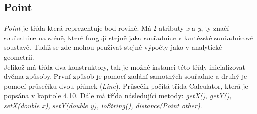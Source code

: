 \subsection{Point} 
\textit{Point} je třída která reprezentuje bod rovině. Má 2 atributy \textit{x} a \textit{y}, ty značí souřadnice na scéně, které fungují stejně jako souřadnice v kartézské souřadnicové soustavě. Tudíž se zde mohou používat stejné výpočty jako v analytické geometrii. \\
Jelikož má třída dva konstruktory, tak je možné instanci této třídy inicializovat dvěma způsoby. První způsob je pomocí zadání samotných souřadnic a druhý je pomocí průsečíku dvou přímek (\textit{Line}). Průsečík počítá třída Calculator, která je popsána v kapitole 4.10. 
Dále má třída následující metody: \textit{getX(), getY(), setX(double x), setY(double y), toString(), distance(Point other)}.
